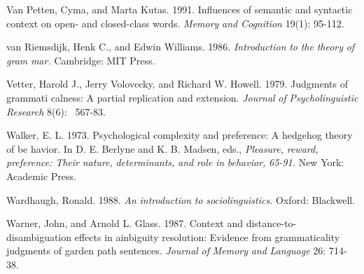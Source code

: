 \begin{styleStandard}
Van Petten, Cyma, and Marta Kutas. 1991. Influences of semantic and syntactic context on open- and closed-class words. \textit{Memory}\textit{ }\textit{and}\textit{ }\textit{Cognition}\textit{ }19(1): 95-112.
\end{styleStandard}


\begin{styleStandard}
van Riemsdijk, Henk C., and Edwin Williams. 1986. \textit{Introduction}\textit{ }\textit{to}\textit{ }\textit{the}\textit{ }\textit{theory}\textit{ }\textit{of}\textit{ }\textit{gram\-}\textit{ }\textit{mar.}\textit{ }Cambridge: MIT Press.
\end{styleStandard}


\begin{styleStandard}
Vetter, Harold J., Jerry Volovecky, and Richard W. Howell. 1979. Judgments of grammati\- calness: A partial replication and extension. \textit{Journal}\textit{ }\textit{of}\textit{ }\textit{Psycholinguistic}\textit{ }\textit{Research}\textit{ }8(6): \ 567-83.
\end{styleStandard}


\begin{styleStandard}
Walker, E. L. 1973. Psychological complexity and preference: A hedgehog theory of be\- havior. In D. E. Berlyne and K. B. Madsen, eds., \textit{Pleasure,}\textit{ }\textit{reward,}\textit{ }\textit{preference:}\textit{ }\textit{Their}\textit{ }\textit{nature,}\textit{ }\textit{determinants,}\textit{ }\textit{and}\textit{ }\textit{role}\textit{ }\textit{in}\textit{ }\textit{behavior,}\textit{ }\textit{65-91.}\textit{ }New York: Academic Press.
\end{styleStandard}


\begin{styleStandard}
Wardhaugh, Ronald. 1988. \textit{An}\textit{ }\textit{introduction}\textit{ }\textit{to}\textit{ }\textit{sociolinguistics.}\textit{ }Oxford: Blackwell.
\end{styleStandard}


\begin{styleStandard}
Warner, John, and Arnold L. Glass. 1987. Context and distance-to-disambiguation effects in ainbiguity resolution: Evidence from grammaticality judgments of garden path sentences. \textit{Journal}\textit{ }\textit{of}\textit{ }\textit{Memory}\textit{ }\textit{and}\textit{ }\textit{Language}\textit{ }26: 714-38.
\end{styleStandard}


